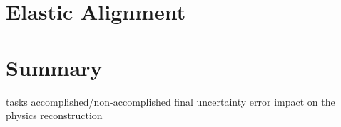 
\section[al elast]{Elastic Alignment}

\section[al sum]{Summary}

\> tasks accomplished/non-accomplished
\> final uncertainty
\> error impact on the physics reconstruction
